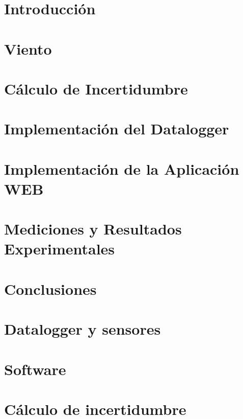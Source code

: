 \documentclass[11pt, a4paper,oneside]{book}
\begin{document}


\clearpage\hbox{}\thispagestyle{empty}\newpage

\clearpage\hbox{}\thispagestyle{empty}\newpage

\clearpage\hbox{}\thispagestyle{empty}\newpage

\clearpage\hbox{}\thispagestyle{empty}\newpage
\tableofcontents
\listoffigures
\listoftables
\newpage

\setcounter{page}{1}

\chapter{Introducción}\label{cap:introduccion}

\chapter{Viento}\label{cap:viento}

\chapter{Cálculo de Incertidumbre}\label{cap:incertidumbre}

\chapter{Implementación del Datalogger}\label{cap:datalogger}

\chapter{Implementación de la Aplicación WEB}\label{cap:aplicacionweb}

\chapter{Mediciones y Resultados Experimentales}\label{cap:med_result}

\chapter{Conclusiones}



\appendix
\chapter{Datalogger y sensores}

\chapter{Software}

\chapter{Cálculo de incertidumbre}

\printbibliography
\end{document}
